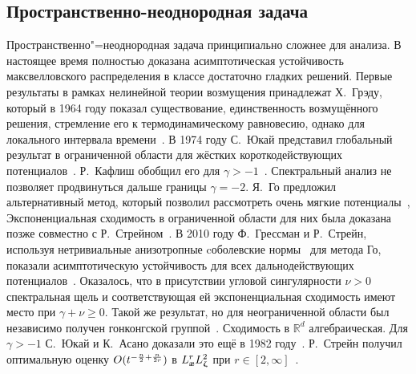 \subsection{Пространственно-неоднородная задача}

Пространственно"=неоднородная задача принципиально сложнее для анализа.
В настоящее время полностью доказана асимптотическая устойчивость максвелловского распределения
в классе достаточно гладких решений.
Первые результаты в рамках нелинейной теории возмущения принадлежат Х.~Грэду, который в 1964 году показал
существование, единственность возмущённого решения, стремление его к термодинамическому равновесию,
однако для локального интервала времени~\cite{Grad1965}.
В 1974 году С.~Юкай представил глобальный результат в ограниченной области
для жёстких короткодействующих потенциалов~\cite{Ukai1974}.
Р.~Кафлиш обобщил его для \(\gamma>-1\)~\cite{Caflisch1980b}.
Спектральный анализ не позволяет продвинуться дальше границы \(\gamma=-2\).
Я.~Го предложил альтернативный метод, который позволил рассмотреть очень мягкие потенциалы~\cite{Guo2003},
Экспоненциальная сходимость в ограниченной области для них была доказана позже совместно с Р.~Стрейном~\cite{Strain2008}.
В 2010 году Ф.~Грессман и Р.~Стрейн, используя нетривиальные анизотропные cоболевские нормы~\cite{Mouhot2007} для метода Го,
показали асимптотическую устойчивость для всех дальнодействующих потенциалов~\cite{Strain2011}.
Оказалось, что в присутствии угловой сингулярности \(\nu>0\) спектральная щель и
соответствующая ей экспоненциальная сходимость имеют место при \(\gamma+\nu\geq0\).
Такой же результат, но для неограниченной области был независимо получен
гонконгской группой~\cite{Alexandre2012soft, Alexandre2011hard, Alexandre2011properties}.
Сходимость в \(\mathbb{R}^d\) алгебраическая. Для \(\gamma>-1\) С.~Юкай и К.~Асано доказали это ещё в 1982 году~\cite{Ukai1982}.
Р.~Стрейн получил оптимальную оценку \(O(t^{-\frac{n}2+\frac{n}{2r}})\) в \(L^r_{\boldsymbol{x}} L^2_{\boldsymbol{\upzeta}}\) при \(r\in[2,\infty]\)~\cite{Strain2012}.

